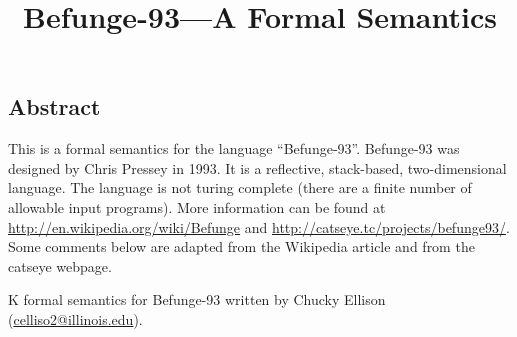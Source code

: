 \title{Befunge-93---A Formal Semantics}
\maketitle

\begin{latexComment}
\section*{Abstract}
This is a formal semantics for the language ``Befunge-93''.  Befunge-93 was designed by Chris Pressey in 1993.  It is a reflective, stack-based, two-dimensional language.  The language is not turing complete (there are a finite number of allowable input programs).  More information can be found at \url{http://en.wikipedia.org/wiki/Befunge} and \url{http://catseye.tc/projects/befunge93/}.  Some comments below are adapted from the Wikipedia article and from the catseye webpage.
	
K formal semantics for Befunge-93 written by Chucky Ellison (\href{mailto:celliso2@illinois.edu}{celliso2@illinois.edu}).
\end{latexComment}

